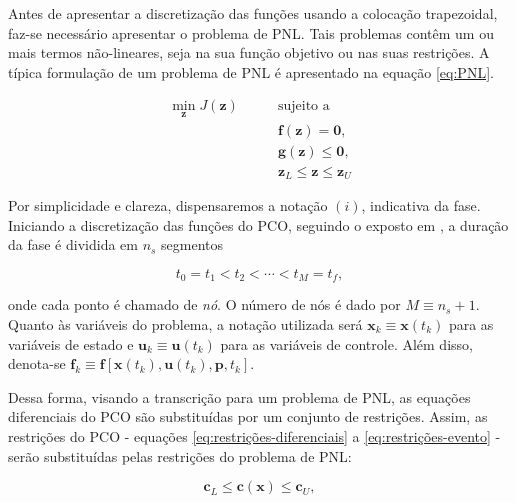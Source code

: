 Antes de apresentar a discretização das funções usando a colocação trapezoidal, faz-se necessário apresentar o problema de PNL. Tais problemas contêm um ou mais termos não-lineares, seja na sua função objetivo ou nas suas restrições. A típica formulação de um problema de PNL é apresentado na equação \ref{eq:PNL}.

\begin{equation}
\label{eq:PNL}
    \begin{aligned}
        \min_\mathbf{z} J(\mathbf{z}) \qquad &\text{sujeito a} \\
        & \mathbf{f}(\mathbf{z}) = \mathbf{0}, \\
        & \mathbf{g}(\mathbf{z}) \leq \mathbf{0}, \\
        & \mathbf{z}_L \leq \mathbf{z} \leq \mathbf{z}_U
    \end{aligned}
\end{equation}

Por simplicidade e clareza, dispensaremos a notação $(i)$, indicativa da fase. Iniciando a discretização das funções do PCO, seguindo o exposto em \cite{betts_practical_2010}, a duração da fase é dividida em $n_s$ segmentos

\begin{equation}
    \label{eq:tempo-disc}
    t_0 = t_1 < t_2 < \cdots < t_M = t_f,
\end{equation}

\noindent onde cada ponto é chamado de \textit{nó}. O número de nós é dado por $M \equiv n_s + 1$. Quanto às variáveis do problema, a notação utilizada será $\mathbf{x}_k \equiv \mathbf{x}(t_k)$ para as variáveis de estado e $\mathbf{u}_k \equiv \mathbf{u}(t_k)$ para as variáveis de controle. Além disso, denota-se $\mathbf{f}_k \equiv \mathbf{f} \left[ \mathbf{x}(t_k), \mathbf{u}(t_k), \mathbf{p}, t_k \right]$.

Dessa forma, visando a transcrição para um problema de PNL, as equações diferenciais do PCO são substituídas por um conjunto de restrições. Assim, as restrições do PCO - equações \ref{eq:restrições-diferenciais} a \ref{eq:restrições-evento} - serão substituídas pelas restrições do problema de PNL:

\begin{equation}
    \mathbf{c}_L \leq \mathbf{c}(\mathbf{x}) \leq \mathbf{c}_U,
\end{equation}

